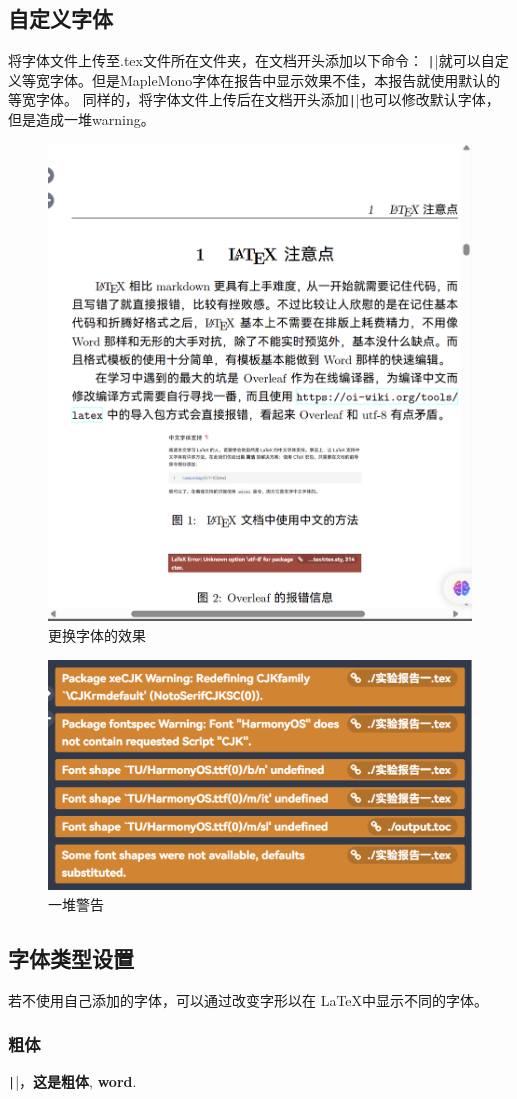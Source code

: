 \documentclass[fontset=ubuntu]{ctexart}
\begin{document}
\subsection{自定义字体}
将字体文件上传至.tex文件所在文件夹，在文档开头添加以下命令：
\texttt|\setmonofont{MapleMono.ttf}|就可以自定义等宽字体。但是MapleMono字体在报告中显示效果不佳，本报告就使用默认的等宽字体。
同样的，将字体文件上传后在文档开头添加\texttt|\setCJKmainfont{}|也可以修改默认字体，但是造成一堆warning。
\begin{figure}[htb]
    \centering
    \includegraphics[width=0.5\linewidth]{font_1.png}
    \caption{更换字体的效果}
    \label{fig:font_1}
\end{figure}

\begin{figure}[htb]
    \centering
    \includegraphics[width=0.5\linewidth]{warning_1.png}
    \caption{一堆警告}
    \label{fig:warning_1}
\end{figure}

\subsection{字体类型设置}
若不使用自己添加的字体，可以通过改变字形以在 \LaTeX 中显示不同的字体。

\subsubsection{粗体}
\texttt|\textbf{}|，\textbf{这是粗体}, \textbf{word}.
\end{document}
